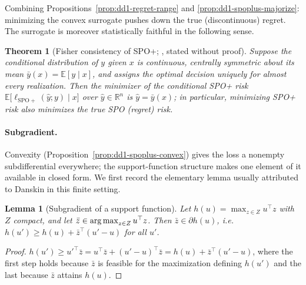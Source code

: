 \documentclass[11pt,a4paper]{article}
\theoremstyle{definition}
\theoremstyle{plain}
\newtheorem{theorem}{Theorem}[section]
\newtheorem{lemma}{Lemma}[section]
\newcommand{\R}{\mathbb{R}}
\newcommand{\E}{\mathbb{E}}
\newcommand{\argmax}{\operatornamewithlimits{arg\,max}}
\begin{document}
Combining Propositions~\ref{prop:dd1-regret-range} and
\ref{prop:dd1-spoplus-majorize}: minimizing the convex surrogate pushes down
the true (discontinuous) regret. The surrogate is moreover statistically
faithful in the following sense.

\begin{theorem}[Fisher consistency of SPO+; \cite{elmachtoub2022smart}, stated
without proof]
\label{thm:dd1-fisher}
Suppose the conditional distribution of $y$ given $x$ is continuous, centrally
symmetric about its mean $\bar{y}(x) = \E[y \mid x]$, and assigns the optimal
decision uniquely for almost every realization. Then the minimizer of the
conditional SPO+ risk $\E\bigl[\ell_{\mathrm{SPO+}}(\hat{y}; y) \mid x\bigr]$
over $\hat{y} \in \R^n$ is $\hat{y} = \bar{y}(x)$; in particular, minimizing
SPO+ risk also minimizes the true SPO (regret) risk.
\end{theorem}

\paragraph{Subgradient.} Convexity (Proposition~\ref{prop:dd1-spoplus-convex})
gives the loss a nonempty subdifferential everywhere; the support-function
structure makes one element of it available in closed form. We first record
the elementary lemma usually attributed to Danskin in this finite setting.

\begin{lemma}[Subgradient of a support function]
\label{lem:dd1-danskin}
Let $h(u) = \max_{z \in Z} u^\top z$ with $Z$ compact, and let
$\bar{z} \in \argmax_{z \in Z} u^\top z$. Then $\bar{z} \in \partial h(u)$,
i.e.\ $h(u') \ge h(u) + \bar{z}^\top (u' - u)$ for all $u'$.
\end{lemma}

\begin{proof}
$h(u') \ge u'^\top \bar{z} = u^\top \bar{z} + (u' - u)^\top \bar{z}
= h(u) + \bar{z}^\top (u' - u)$, where the first step holds because $\bar{z}$
is feasible for the maximization defining $h(u')$ and the last because
$\bar{z}$ attains $h(u)$.
\end{proof}
\end{document}
